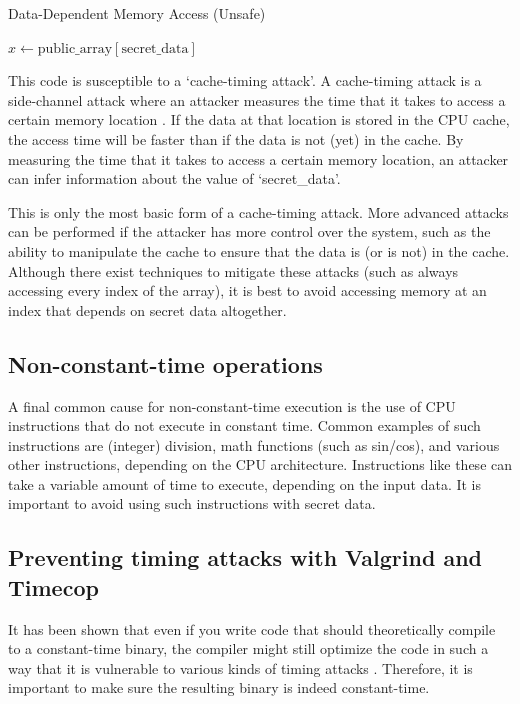 \documentclass[11pt,a4paper]{report}
\theoremstyle{definition}
\begin{document}
\begin{algorithm}
  \caption{Data-Dependent Memory Access (Unsafe)}
  \label{alg:datadependentmemoryaccess}
  \begin{algorithmic}[1]
    \State $x \gets \text{public\_array}[\text{secret\_data}]$
  \end{algorithmic}
\end{algorithm}

This code is susceptible to a `cache-timing attack'. A cache-timing attack is a side-channel attack where an attacker measures the time that it takes to access a certain memory location \cite{kocher1996timing, bernstein2005cache}. If the data at that location is stored in the CPU cache, the access time will be faster than if the data is not (yet) in the cache. By measuring the time that it takes to access a certain memory location, an attacker can infer information about the value of `secret\_data'.

This is only the most basic form of a cache-timing attack. More advanced attacks can be performed if the attacker has more control over the system, such as the ability to manipulate the cache to ensure that the data is (or is not) in the cache. Although there exist techniques to mitigate these attacks (such as always accessing every index of the array), it is best to avoid accessing memory at an index that depends on secret data altogether.

\subsection{Non-constant-time operations}
\label{sec:nonconstanttimeoperations}
A final common cause for non-constant-time execution is the use of CPU instructions that do not execute in constant time. Common examples of such instructions are (integer) division, math functions (such as sin/cos), and various other instructions, depending on the CPU architecture. Instructions like these can take a variable amount of time to execute, depending on the input data. It is important to avoid using such instructions with secret data.

\subsection{Preventing timing attacks with Valgrind and Timecop}
\label{sec:valgrindtimecop}
It has been shown that even if you write code that should theoretically compile to a constant-time binary, the compiler might still optimize the code in such a way that it is vulnerable to various kinds of timing attacks \cite{simon2018you, barthe2019formal}. Therefore, it is important to make sure the resulting binary is indeed constant-time.
\end{document}
